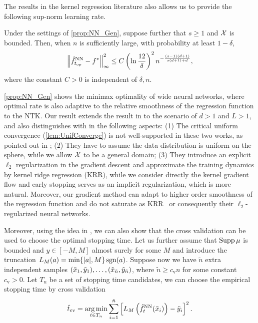 The results in the kernel regression literature also allows us to provide the following sup-norm learning rate.

\begin{proposition}
  \label{prop:NN_Sup_Gen}
  Under the settings of \cref{prop:NN_Gen}, suppose further that $s \geq 1$ and $\mathcal{X}$ is bounded.
  Then, when $n$ is sufficiently large,  with probability at least $1-\delta$,
  \begin{align*}
    \norm{\hat{f}^{\mathrm{NN}}_{t_{\mathrm{op}}} - f^*}_{\infty}^2 \leq C \left( \ln\frac{12}{\delta} \right)^2 n^{-\frac{(s-1)(d+1)}{s(d+1)+d}},
  \end{align*}
  where the constant $C>0$ is independent of $\delta,n$.
\end{proposition}


\begin{remark}
  \cref{prop:NN_Gen} shows the minimax optimality of wide neural networks,
  where optimal rate is also adaptive to the relative smoothness of the regression function to the NTK\@.
  Our result extends the result in \citet{lai2023_GeneralizationAbility} to the scenario of $d > 1$ and $L > 1$,
  and also distinguishes with \citet{hu2021_RegularizationMatters,suh2022_NonparametricRegression} in the following aspects:
  (1) The critical uniform convergence (\cref{lem:UnifConverge}) is not well-supported in these two works, as pointed out in \citet{lai2023_GeneralizationAbility};
  (2) They have to assume the data distribution is uniform on the sphere, while we allow $\mathcal{X}$ to be a general domain;
  (3) They introduce an explicit $\ell_2$ regularization in the gradient descent and approximate the training dynamics by kernel ridge regression (KRR),
  while we consider directly the kernel gradient flow and early stopping serves as an implicit regularization, which is more natural.
  Moreover, our gradient method can adapt to higher order smoothness of the regression function and do not
  saturate as KRR~\citep{li2023_SaturationEffect} or consequently their $\ell_2$-regularized neural networks.
\end{remark}

Moreover, using the idea in \citet{caponnetto2010_CrossvalidationBased},
we can also show that the cross validation can be used to choose the optimal stopping time.
Let us further assume that $\operatorname*{Supp} \mu$ is bounded and $y \in [-M,M]$ almost surely for some $M$ and introduce the truncation $L_{M}(a)=\min\{\abs{a},M\}\operatorname{sgn}(a)$.
Suppose now we have $\tilde{n}$ extra independent samples $(\tilde{x}_1,\tilde{y}_1),\dots,(\tilde{x}_{\tilde{n}},\tilde{y}_{\tilde{n}})$,
where $\tilde{n} \geq c_{\mathrm{v}} n$ for some constant $c_{\mathrm{v}} > 0$.
Let $T_n$ be a set of stopping time candidates, we can choose the empirical stopping time by cross validation
\begin{align}
  \label{eq:5_StoppingTimeCV}
  \hat{t}_{\mathrm{cv}} = \operatorname*{arg\,min}_{t \in T_n}
  \sum_{i=1}^{\tilde{n}} \left[ L_{M}\left(\hat{f}^{\mathrm{NN}}_t(\tilde{x}_i)\right) - \tilde{y}_i \right]^2.
\end{align}

